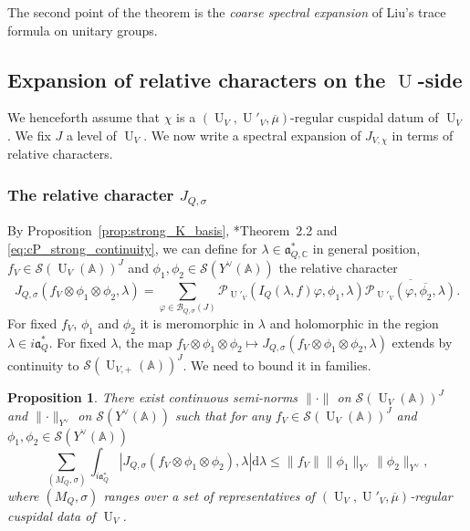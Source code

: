 \documentclass[letterpaper,11pt]{amsart}
\newcommand{\bA}{\mathbb{A}}
\newcommand{\C}{\mathbb{C}}
\newcommand{\cS}{\mathcal{S}}
\newcommand{\rd}{\mathrm{d}}
\newcommand{\<}{\negthickspace}
\providecommand{\aabs}[1]{\lVert#1\rVert}
\newcommand{\valP}[1]{\left|#1\right|}
\DeclareMathOperator{\U}{U}
\theoremstyle{definition}
\theoremstyle{plain}
\newtheorem{prop}[definition]{Proposition}
\theoremstyle{remark}
\numberwithin{equation}{section}
\begin{document}
The second point of the theorem is the \emph{coarse spectral expansion} of Liu's trace formula on unitary groups.



\subsection{Expansion of relative characters on the $\U$-side}
\label{sec:expansion_spectral_u}
We henceforth assume that $\chi$ is a $(\U_V,\U'_V,\overline{\mu})$-regular cuspidal datum of $\U_V$. We fix $J$ a level of $\U_V$. We now write a spectral expansion of $J_{V,\chi}$ in terms of relative characters.

\subsubsection{The relative character \texorpdfstring{$J_{Q,\sigma}$}{}}
\label{subsec:J_Q_sigma}

By Proposition~\ref{prop:strong_K_basis}, \cite{Lap}*{Theorem~2.2} and \eqref{eq:cP_strong_continuity}, we can define for $\lambda \in  \mathfrak{a}_{Q,\C}^*$ in general position, $f_V \in \cS(\U_V(\bA))^J$ and $\phi_1, \phi_2 \in
\cS(Y^\vee(\bA))$ the relative character
    \begin{equation}    \label{eq:P_abs_conv}
    J_{Q,\sigma}(f_V \otimes \phi_1 \otimes \phi_2,\lambda) =
    \sum_{\varphi \in \mathcal{B}_{Q,\sigma}(J)}
    \mathcal{P}_{\U'_V}(I_Q(\lambda,f)\varphi,\phi_1,\lambda)
    \overline{\mathcal{P}_{\U'_V}(\varphi,\overline{\phi_2},\lambda)}.
    \end{equation}
For fixed $f_V$, $\phi_1$ and
$\phi_2$ it is meromorphic in $\lambda$ and holomorphic in the region $\lambda \in  i
\mathfrak{a}_Q^*$. For fixed $\lambda$, the map $f_V \otimes \phi_1 \otimes \phi_2 \mapsto J_{Q,\sigma}( f_V \otimes \phi_1 \otimes \phi_2,\lambda)$ extends by continuity to $\cS(\U_{V,+}(\bA))^J$. We need to bound it in families.


\begin{prop}    \label{prop:IY_sum_convergence}
There exist continuous semi-norms $\aabs{\cdot}$ on $\cS(\U_V(\bA))^J$ and $\aabs{\cdot}_{Y^\vee}$ on $\cS(Y^\vee(\bA))$ such that for any $f_V \in \cS(\U_V(\bA))^J$ and $\phi_1, \phi_2 \in \cS(Y^\vee(\bA))$
    \begin{equation}    \label{eq:sum_over_weyl_oribts}
    \sum_{(M_Q,\sigma)} \int_{ i \mathfrak{a}_Q^*}
    \valP{J_{Q,\sigma}( f_V \otimes \phi_1 \otimes \phi_2),\lambda} \rd \lambda
    \leq \aabs{f_V} \aabs{\phi_1}_{Y^\vee} \aabs{\phi_2}_{Y^\vee},
    \end{equation}
where $(M_Q,\sigma)$ ranges over a set of representatives of $(\U_V,\U'_V,\overline{\mu})$-regular cuspidal data
of $\U_V$. 
\end{prop}
\end{document}
